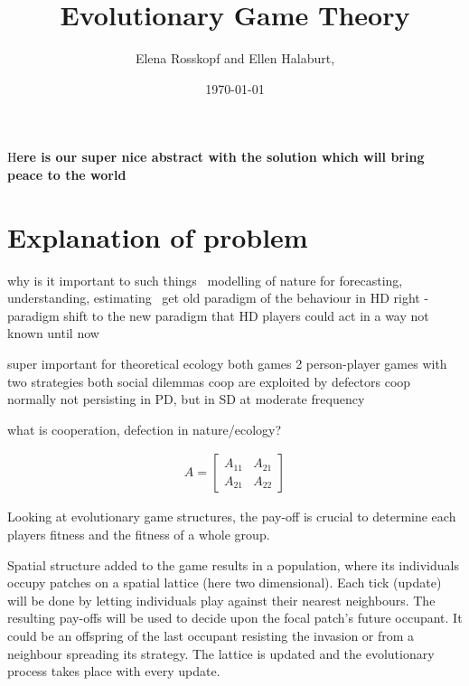 \documentclass[DIV=calc, paper=a4, fontsize=11pt, twocolumn]{scrartcl}	 %
\title{Evolutionary Game Theory} %
\author{Elena Rosskopf and Ellen Halaburt, } %
\date{\today} %
\newcommand{\initial}[1]{ %
\lettrine[lines=3,lhang=0.3,nindent=0em]{
\color{DarkGoldenrod}
{\textsf{#1}}}{}}
\begin{document}
\maketitle %

\thispagestyle{fancy} %


\initial{H}\textbf{ere is our super nice abstract with the solution which will bring peace to the world}


\section*{Explanation of problem}

\noindent why is it important to such things \
modelling of nature for forecasting, understanding, estimating  \
get old paradigm of the behaviour in HD right - paradigm shift to the new paradigm that HD players could act in a way not known until now

super important for theoretical ecology
both games 2 person-player games with two strategies 
both social dilemmas 
coop are exploited by defectors 
coop normally not persisting in PD, but in SD at moderate frequency

what is cooperation, defection in nature/ecology? 


\begin{align}
A = 
\begin{bmatrix}
A_{11} & A_{21} \\
A_{21} & A_{22}
\end{bmatrix}
\end{align}

Looking at evolutionary game structures, the pay-off is crucial to determine each players fitness and the fitness of a whole group. 

Spatial structure added to the game results in a population, where its individuals occupy patches on a spatial lattice (here two dimensional). 
Each tick (update) will be done by letting individuals play against their nearest neighbours. The resulting pay-offs will be used to decide upon the focal patch's future occupant. It could be an offspring of the last occupant resisting the invasion or from a neighbour spreading its strategy. The lattice is updated and the evolutionary process takes place with every update.
\end{document}
